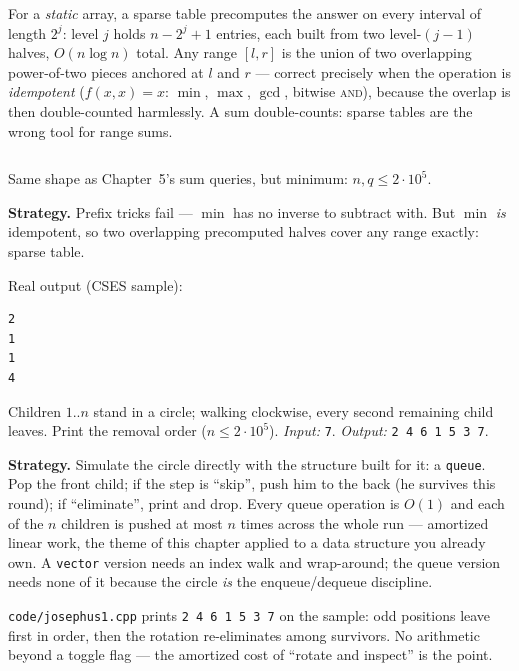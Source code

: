 For a \emph{static} array, a sparse table precomputes the answer on
every interval of length $2^j$: level $j$ holds $n - 2^j + 1$ entries,
each built from two level-$(j{-}1)$ halves, $O(n \log n)$ total. Any
range $[l,r]$ is the union of two overlapping power-of-two pieces
anchored at $l$ and $r$ --- correct precisely when the operation is
\emph{idempotent} ($f(x,x) = x$: $\min$, $\max$, $\gcd$, bitwise
\textsc{and}), because the overlap is then double-counted harmlessly.
A sum double-counts: sparse tables are the wrong tool for range sums.

\begin{lstlisting}[language=C++,caption={\texttt{sparse.h}: $O(n\log n)$
build, $O(1)$ query.},label={lst:sparse}]
\end{lstlisting}


\begin{example}\label{ex:rmq}
Same shape as Chapter~5's sum queries, but minimum: $n,q \le
2\cdot10^5$.
\par\smallskip
\textbf{Strategy.} Prefix tricks fail --- $\min$ has no inverse to
subtract with. But $\min$ \emph{is} idempotent, so two overlapping
precomputed halves cover any range exactly: sparse table.
\par\smallskip
\begin{solution}

Real output (CSES sample):
\begin{lstlisting}[numbers=none]
2
1
1
4
\end{lstlisting}
\end{solution}
\end{example}

\begin{example}
\label{ex:joseph}
Children $1..n$ stand in a circle; walking clockwise, every second
remaining child leaves. Print the removal order ($n \le 2\cdot10^5$).
\emph{Input:} \texttt{7}. \emph{Output:} \texttt{2 4 6 1 5 3 7}.
\par\smallskip
\textbf{Strategy.} Simulate the circle directly with the structure built
for it: a \texttt{queue}. Pop the front child; if the step is ``skip'',
push him to the back (he survives this round); if ``eliminate'', print
and drop. Every queue operation is $O(1)$ and each of the $n$ children
is pushed at most $n$ times across the whole run --- amortized linear
work, the theme of this chapter applied to a data structure you already
own. A \texttt{vector} version needs an index walk and wrap-around; the
queue version needs none of it because the circle \emph{is} the
enqueue/dequeue discipline.
\par\smallskip
\begin{solution}
\texttt{code/josephus1.cpp} prints \texttt{2 4 6 1 5 3 7} on the
sample: odd positions leave first in order, then the rotation
re-eliminates among survivors. No arithmetic beyond a toggle flag ---
the amortized cost of ``rotate and inspect'' is the point.
\end{solution}
\end{example}

